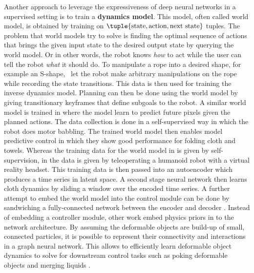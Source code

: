 \documentclass[\home/main.tex]{subfiles}
\begin{document}
Another approach to leverage the expressiveness of deep neural networks in a supervised setting is to train a \textbf{dynamics model}. This model, often called world model, is obtained by training on $\tuple{\text{state}, \text{action}, \text{next state}}$ tuples. The problem that world models try to solve is finding the optimal sequence of actions that brings the given input state to the desired output state by querying the world model. Or in other words, the robot knows \textit{how} to act while the user can tell the robot \textit{what} it should do. To manipulate a rope into a desired shape, for example an S-shape,~\textcite{Nair2017} let the robot make arbitrary manipulations on the rope while recording the state transitions. This data is then used for training the inverse dynamics model. Planning can then be done using the world model by giving transitionary keyframes that define subgoals to the robot. A similar world model is trained in \autocite{Ebert2018} where the model learn to predict future pixels given the planned actions. The data collection is done in a self-supervised way in which the robot does motor babbling. The trained world model then enables model predictive control in which they show good performance for folding cloth and towels. Whereas the training data for the world model in \autocite{Nair2017} is given by self-supervision, in \autocite{Yang2016} the data is given by teleoperating a humanoid robot with a virtual reality headset. This training data is then passed into an autoencoder which produces a time series in latent space. A second stage neural network then learns cloth dynamics by sliding a window over the encoded time series. A further attempt to embed the world model into the control module can be done by sandwiching a fully-connected network between the encoder and decoder \autocite{Tanaka2018}. Instead of embedding a controller module, other work embed physics priors in to the network architecture. By assuming the deformable objects are build-up of small, connected particles, it is possible to represent their connectivity and interactions in a graph neural network. This allows to efficiently learn deformable object dynamics to solve for downstream control tasks such as poking deformable objects \autocite{Mrowca2018} and merging liquids \autocite{Li2018}.

\end{document}
